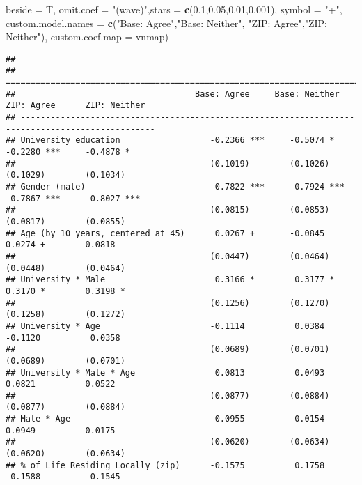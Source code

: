 \documentclass[
]{article}
\newenvironment{Shaded}{\begin{snugshade}}{\end{snugshade}}
\newcommand{\DataTypeTok}[1]{\textcolor[rgb]{0.13,0.29,0.53}{#1}}
\newcommand{\FloatTok}[1]{\textcolor[rgb]{0.00,0.00,0.81}{#1}}
\newcommand{\KeywordTok}[1]{\textcolor[rgb]{0.13,0.29,0.53}{\textbf{#1}}}
\newcommand{\NormalTok}[1]{#1}
\newcommand{\StringTok}[1]{\textcolor[rgb]{0.31,0.60,0.02}{#1}}
\begin{document}
\begin{Shaded}
\begin{Highlighting}[]
          \DataTypeTok{beside =}\NormalTok{ T,}
          \DataTypeTok{omit.coef =} \StringTok{"(wave)"}\NormalTok{,}\DataTypeTok{stars =} \KeywordTok{c}\NormalTok{(}\FloatTok{0.1}\NormalTok{,}\FloatTok{0.05}\NormalTok{,}\FloatTok{0.01}\NormalTok{,}\FloatTok{0.001}\NormalTok{), }\DataTypeTok{symbol =} \StringTok{"+"}\NormalTok{, }
          \DataTypeTok{custom.model.names =} \KeywordTok{c}\NormalTok{(}\StringTok{"Base: Agree"}\NormalTok{,}\StringTok{"Base: Neither"}\NormalTok{,}
                                 \StringTok{"ZIP: Agree"}\NormalTok{,}\StringTok{"ZIP: Neither"}\NormalTok{),}
          \DataTypeTok{custom.coef.map =}\NormalTok{ vnmap)}
\end{Highlighting}
\end{Shaded}

\begin{verbatim}
## 
## =================================================================================================
##                                    Base: Agree     Base: Neither   ZIP: Agree      ZIP: Neither  
## -------------------------------------------------------------------------------------------------
## University education                  -0.2366 ***     -0.5074 *       -0.2280 ***     -0.4878 *  
##                                       (0.1019)        (0.1026)        (0.1029)        (0.1034)   
## Gender (male)                         -0.7822 ***     -0.7924 ***     -0.7867 ***     -0.8027 ***
##                                       (0.0815)        (0.0853)        (0.0817)        (0.0855)   
## Age (by 10 years, centered at 45)      0.0267 +       -0.0845          0.0274 +       -0.0818    
##                                       (0.0447)        (0.0464)        (0.0448)        (0.0464)   
## University * Male                      0.3166 *        0.3177 *        0.3170 *        0.3198 *  
##                                       (0.1256)        (0.1270)        (0.1258)        (0.1272)   
## University * Age                      -0.1114          0.0384         -0.1120          0.0358    
##                                       (0.0689)        (0.0701)        (0.0689)        (0.0701)   
## University * Male * Age                0.0813          0.0493          0.0821          0.0522    
##                                       (0.0877)        (0.0884)        (0.0877)        (0.0884)   
## Male * Age                             0.0955         -0.0154          0.0949         -0.0175    
##                                       (0.0620)        (0.0634)        (0.0620)        (0.0634)   
## % of Life Residing Locally (zip)      -0.1575          0.1758         -0.1588          0.1545    

\end{verbatim}
\end{document}
